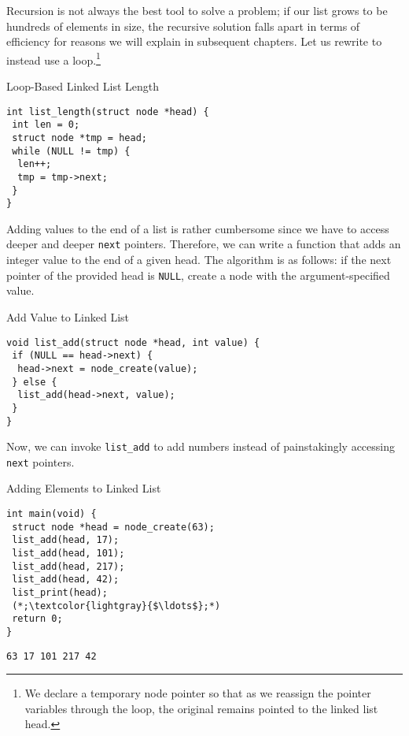 Recursion is not always the best tool to solve a problem; if our list grows to be hundreds of elements in size, the recursive solution falls apart in terms of efficiency for reasons we will explain in subsequent chapters. Let us rewrite  to instead use a loop.\footnote{We declare a temporary node pointer so that as we reassign the pointer variables through the loop, the original  remains pointed to the linked list head.}

\begin{cl}[main.c]{Loop-Based Linked List Length}
\begin{lstlisting}[language=MyC]
int list_length(struct node *head) {
 int len = 0;
 struct node *tmp = head;
 while (NULL != tmp) {
  len++;
  tmp = tmp->next;
 }
}
\end{lstlisting}
\end{cl}

Adding values to the end of a list is rather cumbersome since we have to access deeper and deeper \texttt{next} pointers. Therefore, we can write a function that adds an integer value to the end of a given head. The algorithm is as follows: if the next pointer of the provided head is \texttt{NULL}, create a node with the argument-specified value.

\begin{cl}[main.c]{Add Value to Linked List}\begin{lstlisting}[language=MyC]
void list_add(struct node *head, int value) {
 if (NULL == head->next) {
  head->next = node_create(value);
 } else {
  list_add(head->next, value);
 }
}
\end{lstlisting}\end{cl}

Now, we can invoke \texttt{list\_add} to add numbers instead of painstakingly accessing \texttt{next} pointers.

\begin{cloast}[main.c]{Adding Elements to Linked List}\begin{lstlisting}[language=MyC]
int main(void) {
 struct node *head = node_create(63);
 list_add(head, 17);
 list_add(head, 101);
 list_add(head, 217);
 list_add(head, 42);
 list_print(head);
 (*;\textcolor{lightgray}{$\ldots$};*)
 return 0;
}
\end{lstlisting}
\tcblower
\begin{lstlisting}[language=MyOutput]
63 17 101 217 42
\end{lstlisting}
\end{cloast}

